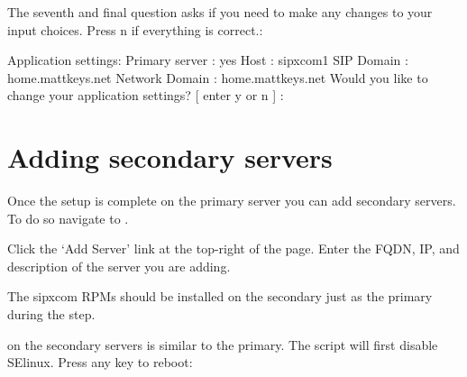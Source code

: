 \documentclass[letterpaper,10pt,english]{sphinxmanual}
\begin{document}
The seventh and final question asks if you need to make any changes to your input choices. Press n if everything is correct.:

\begin{sphinxVerbatim}[commandchars=\\\{\}]
Application settings:
Primary server : yes
Host           : sipxcom1
SIP Domain     : home.mattkeys.net
Network Domain : home.mattkeys.net
Would you like to change your application settings? [ enter \PYGZsq{}y\PYGZsq{} or \PYGZsq{}n\PYGZsq{} ] :
\end{sphinxVerbatim}


\section{Adding secondary servers}
\label{\detokenize{setupscript:adding-secondary-servers}}\label{\detokenize{setupscript:id2}}
Once the setup is complete on the primary server you can add secondary servers. To do so navigate to {\hyperref[\detokenize{webui:servers-tab}]{}}.
\begin{quote}

\end{quote}

Click the ‘Add Server’ link at the top-right of the page. Enter the FQDN, IP, and description of the server you are adding.
\begin{quote}

\end{quote}

The sipxcom RPMs should be installed on the secondary just as the primary during the {\hyperref[\detokenize{installation:rpm-installation}]{}} step.

{\hyperref[\detokenize{setupscript:id1}]{}} on the secondary servers is similar to the primary. The script will first disable SElinux. Press any key to reboot:

\begin{sphinxVerbatim}[commandchars=\\\{\}]
 
      
                    
       
\end{sphinxVerbatim}
\end{document}
